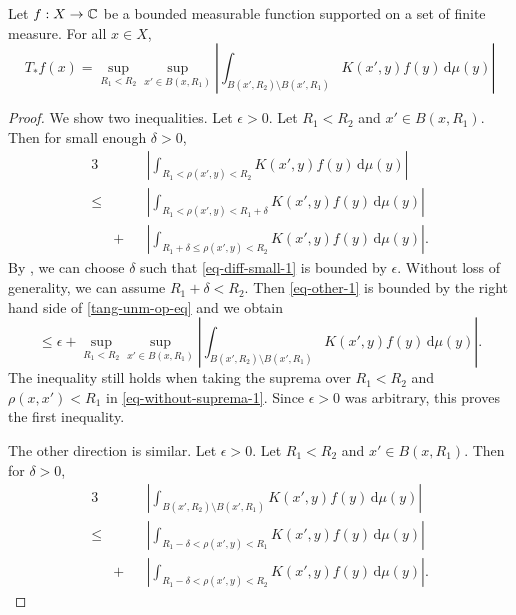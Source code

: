 \begin{lemma}
    \label{nontangential-operator-boundary}
    \leanok
    Let $f:X\to\mathbb{C}$ be a bounded measurable function supported on a set of finite measure.
    For all $x\in X$,
    \begin{equation}
    \label{tang-unm-op-eq}
        T_*f(x) = \sup_{R_1 < R_2} \sup_{x'\in B(x,R_1)} \left|\int_{B(x',R_2)\setminus B(x',R_1)} K(x',y) f(y) \, \mathrm{d}\mu(y) \right|
    \end{equation}
\end{lemma}
\begin{proof}
\leanok
We show two inequalities. Let $\epsilon>0$.
Let $R_1<R_2$ and $x'\in B(x,R_1)$. Then for small enough $\delta>0$,
\begin{alignat}{3}
    \label{eq-without-suprema-1}
    &&&\left|\int_{R_1<\rho(x',y)<R_2} K(x',y) f(y) \, \mathrm{d}\mu(y) \right| \\
    \label{eq-diff-small-1}
    \le &&&\left|\int_{R_1<\rho(x',y)<R_1+\delta} K(x',y) f(y) \, \mathrm{d}\mu(y) \right| \\
    \label{eq-other-1}
    &+&&\left|\int_{R_1+\delta\le\rho(x',y)<R_2} K(x',y) f(y) \, \mathrm{d}\mu(y) \right| .
\end{alignat}
By , we can choose $\delta$ such that \eqref{eq-diff-small-1} is bounded by $\epsilon$. Without loss of generality, we can assume $R_1+\delta<R_2$. Then \eqref{eq-other-1} is bounded by the right hand side of \eqref{tang-unm-op-eq} and we obtain
\begin{equation*}
    \le \epsilon + \sup_{R_1 < R_2} \sup_{x'\in B(x,R_1)} \left|\int_{B(x',R_2)\setminus B(x',R_1)} K(x',y) f(y) \, \mathrm{d}\mu(y) \right| .
\end{equation*}
The inequality still holds when taking the suprema over $R_1<R_2$ and $\rho(x,x')<R_1$ in \eqref{eq-without-suprema-1}. Since $\epsilon>0$ was arbitrary, this proves the first inequality.

The other direction is similar. Let $\epsilon>0$.
Let $R_1<R_2$ and $x'\in B(x,R_1)$. Then for $\delta>0$,
\begin{alignat}{3}
    \label{eq-without-suprema-2}
    &&&\left|\int_{B(x',R_2)\setminus B(x',R_1)} K(x',y) f(y) \, \mathrm{d}\mu(y) \right| \\
    \label{eq-diff-small-2}
    \le &&&\left|\int_{R_1-\delta<\rho(x',y)< R_1} K(x',y) f(y) \, \mathrm{d}\mu(y) \right| \\
    \label{eq-other-2}
    &+&&\left|\int_{R_1-\delta<\rho(x',y)<R_2} K(x',y) f(y) \, \mathrm{d}\mu(y) \right| .
\end{alignat}


\end{proof}
